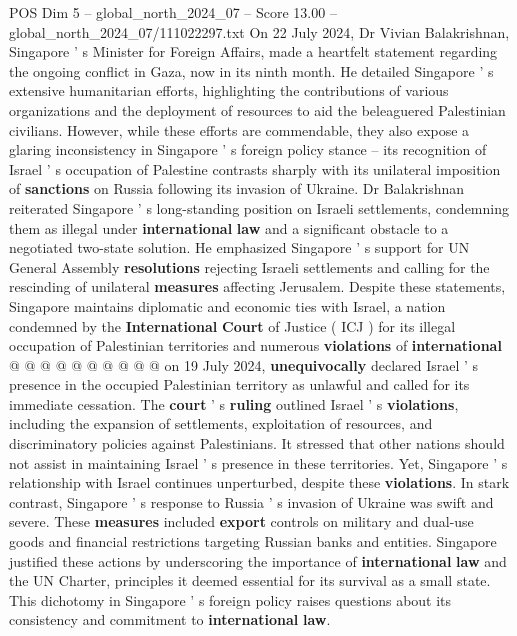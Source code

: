 \begin{textsample}{POS Dim 5 – global\_north\_2024\_07 – Score 13.00 – global\_north\_2024\_07/111022297.txt}  \label{ex:f5_pos_307}
On 22 July 2024, Dr Vivian Balakrishnan, Singapore ' s Minister for Foreign Affairs, made a heartfelt statement regarding the ongoing conflict in Gaza, now in its ninth month.
He detailed Singapore ' s extensive humanitarian efforts, highlighting the contributions of various organizations and the deployment of resources to aid the beleaguered Palestinian civilians.
However, while these efforts are commendable, they also expose a glaring inconsistency in Singapore ' s foreign policy stance -- its recognition of Israel ' s occupation of Palestine contrasts sharply with its unilateral imposition of \textbf{sanctions} on Russia following its invasion of Ukraine.
Dr Balakrishnan reiterated Singapore ' s long-standing position on Israeli settlements, condemning them as illegal under \textbf{international} \textbf{law} and a significant obstacle to a negotiated two-state solution.
He emphasized Singapore ' s support for UN General Assembly \textbf{resolutions} rejecting Israeli settlements and calling for the rescinding of unilateral \textbf{measures} affecting Jerusalem.
Despite these statements, Singapore maintains diplomatic and economic ties with Israel, a nation condemned by the \textbf{International} \textbf{Court} of Justice ( ICJ ) for its illegal occupation of Palestinian territories and numerous \textbf{violations} of \textbf{international} @ @ @ @ @ @ @ @ @ @ on 19 July 2024, \textbf{unequivocally} declared Israel ' s presence in the occupied Palestinian territory as unlawful and called for its immediate cessation.
The \textbf{court} ' s \textbf{ruling} outlined Israel ' s \textbf{violations}, including the expansion of settlements, exploitation of resources, and discriminatory policies against Palestinians.
It stressed that other nations should not assist in maintaining Israel ' s presence in these territories.
Yet, Singapore ' s relationship with Israel continues unperturbed, despite these \textbf{violations}.
In stark contrast, Singapore ' s response to Russia ' s invasion of Ukraine was swift and severe.
These \textbf{measures} included \textbf{export} controls on military and dual-use goods and financial restrictions targeting Russian banks and entities.
Singapore justified these actions by underscoring the importance of \textbf{international} \textbf{law} and the UN Charter, principles it deemed essential for its survival as a small state.
This dichotomy in Singapore ' s foreign policy raises questions about its consistency and commitment to \textbf{international} \textbf{law}.

\end{textsample}
